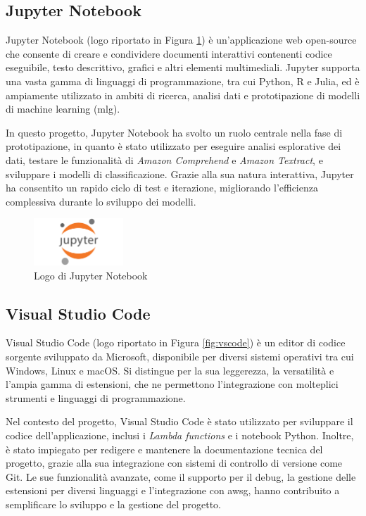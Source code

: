 \subsection{Jupyter Notebook}

Jupyter Notebook (logo riportato in Figura \ref{fig:jupyter}) è un'applicazione web open-source che consente di creare e condividere documenti interattivi contenenti codice eseguibile, testo descrittivo, grafici e altri elementi multimediali. Jupyter supporta una vasta gamma di linguaggi di programmazione, tra cui Python, R e Julia, ed è ampiamente utilizzato in ambiti di ricerca, analisi dati e prototipazione di modelli di machine learning (\gls{mlg}).

In questo progetto, Jupyter Notebook ha svolto un ruolo centrale nella fase di prototipazione, in quanto è stato utilizzato per eseguire analisi esplorative dei dati, testare le funzionalità di \textit{Amazon Comprehend} e \textit{Amazon Textract}, e sviluppare i modelli di classificazione. Grazie alla sua natura interattiva, Jupyter ha consentito un rapido ciclo di test e iterazione, migliorando l'efficienza complessiva durante lo sviluppo dei modelli.

\begin{figure}[h]
  \centering
  \includegraphics[width=0.3\textwidth]{img/tecnologie/jupyter.png}
  \caption{Logo di Jupyter Notebook}
  \label{fig:jupyter}
\end{figure}

\subsection{Visual Studio Code}

Visual Studio Code (logo riportato in Figura \ref{fig:vscode}) è un editor di codice sorgente sviluppato da Microsoft, disponibile per diversi sistemi operativi tra cui Windows, Linux e macOS. Si distingue per la sua leggerezza, la versatilità e l'ampia gamma di estensioni, che ne permettono l'integrazione con molteplici strumenti e linguaggi di programmazione.

Nel contesto del progetto, Visual Studio Code è stato utilizzato per sviluppare il codice dell'applicazione, inclusi i \textit{Lambda functions} e i notebook Python. Inoltre, è stato impiegato per redigere e mantenere la documentazione tecnica del progetto, grazie alla sua integrazione con sistemi di controllo di versione come Git. Le sue funzionalità avanzate, come il supporto per il debug, la gestione delle estensioni per diversi linguaggi e l'integrazione con \gls{awsg}, hanno contribuito a semplificare lo sviluppo e la gestione del progetto.

